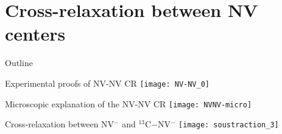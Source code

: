 \documentclass{beamer}
\begin{document}
\section{Cross-relaxation between NV centers}
\begin{frame}{Outline}
\tableofcontents[currentsection]
\end{frame}
\begin{frame}{Experimental proofs of NV-NV CR}
\texttt{[image: NV-NV\_0]}
\end{frame}
\begin{frame}{Microscopic explanation of the NV-NV CR}
\centering
\texttt{[image: NVNV-micro]}
\end{frame}
\begin{frame}{Cross-relaxation between NV$^-$ and $^{13}$C$-$NV$^-$}
\texttt{[image: soustraction\_3]}
\end{frame}
\end{document}
